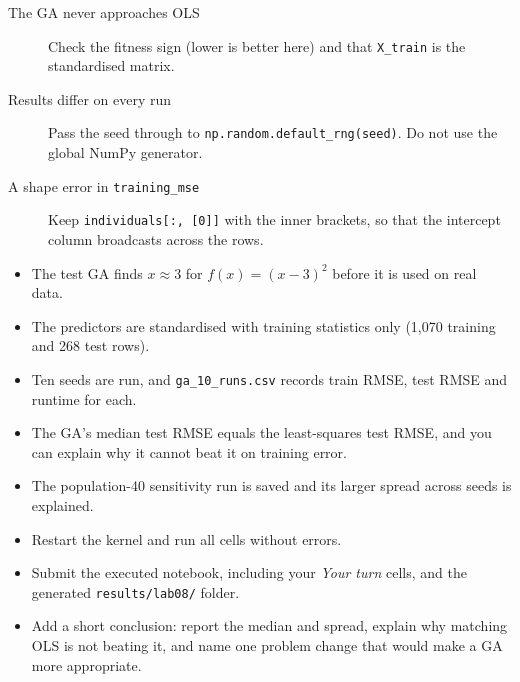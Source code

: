 \begin{troubleshoot}
\begin{description}
  \item[The GA never approaches OLS] Check the fitness sign (lower is better here) and that \texttt{X\_train} is the standardised matrix.
  \item[Results differ on every run] Pass the seed through to \texttt{np.random.default\_rng(seed)}. Do not use the global NumPy generator.
  \item[A shape error in \texttt{training\_mse}] Keep \texttt{individuals[:, [0]]} with the inner brackets, so that the intercept column broadcasts across the rows.
\end{description}
\end{troubleshoot}

\begin{verification}
\begin{itemize}
  \item The test GA finds $x\approx3$ for $f(x)=(x-3)^2$ before it is used on real data.
  \item The predictors are standardised with training statistics only (1,070 training and 268 test rows).
  \item Ten seeds are run, and \texttt{ga\_10\_runs.csv} records train RMSE, test RMSE and runtime for each.
  \item The GA's median test RMSE equals the least-squares test RMSE, and you can explain why it cannot beat it on training error.
  \item The population-40 sensitivity run is saved and its larger spread across seeds is explained.
\end{itemize}
\end{verification}

\begin{labdeliverable}
\begin{itemize}
  \item Restart the kernel and run all cells without errors.
  \item Submit the executed notebook, including your \emph{Your turn} cells, and the generated \texttt{results/lab08/} folder.
  \item Add a short conclusion: report the median and spread, explain why matching OLS is not beating it, and name one problem change that would make a GA more appropriate.
\end{itemize}
\end{labdeliverable}
